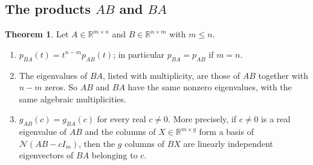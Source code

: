 \documentclass[12pt]{article}
\newcommand{\R}{\mathbb R}
\theoremstyle{definition}
\newtheorem{theorem}{Theorem}
\begin{document}
\subsection*{The products \(AB\) and \(BA\)}

\begin{theorem}\label{r7-thm-AB-BA}
Let \(A\in\R^{m\times n}\) and \(B\in\R^{n\times m}\) with \(m\leqslant n\).
\begin{enumerate}
\item \(p_{BA}(t)=t^{n-m}p_{AB}(t)\); in particular \(p_{BA}=p_{AB}\) if \(m=n\).
\item The eigenvalues of \(BA\), listed with multiplicity, are those of \(AB\) together with \(n-m\) zeros. So \(AB\) and
\(BA\) have the same nonzero eigenvalues, with the same algebraic multiplicities.
\item \(g_{AB}(c)=g_{BA}(c)\) for every real \(c\ne0\). More precisely, if \(c\ne0\) is a real eigenvalue of \(AB\) and
the columns of \(X\in\R^{m\times g}\) form a basis of \(\mathcal N(AB-cI_m)\), then the \(g\) columns of \(BX\) are linearly
independent eigenvectors of \(BA\) belonging to \(c\).
\end{enumerate}
\end{theorem}
\end{document}
